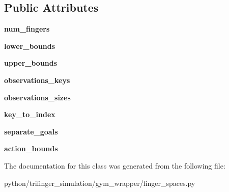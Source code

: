 \subsection*{Public Attributes}
\begin{DoxyCompactItemize}
\item 
\mbox{\label{classtrifinger__simulation_1_1gym__wrapper_1_1finger__spaces_1_1FingerSpaces_aef6a5facf4a5770bb52d7e118f27092b}} 
{\bfseries num\+\_\+fingers}
\item 
\mbox{\label{classtrifinger__simulation_1_1gym__wrapper_1_1finger__spaces_1_1FingerSpaces_ae48dce07f3223ad09ed3752f8a4ca267}} 
{\bfseries lower\+\_\+bounds}
\item 
\mbox{\label{classtrifinger__simulation_1_1gym__wrapper_1_1finger__spaces_1_1FingerSpaces_af942cd00b37c2e51bccfb724b4bcced2}} 
{\bfseries upper\+\_\+bounds}
\item 
\mbox{\label{classtrifinger__simulation_1_1gym__wrapper_1_1finger__spaces_1_1FingerSpaces_a9b82d691aebb956d9920063ff7f9169b}} 
{\bfseries observations\+\_\+keys}
\item 
\mbox{\label{classtrifinger__simulation_1_1gym__wrapper_1_1finger__spaces_1_1FingerSpaces_a6cff11eb6d063691df77044a78c348b3}} 
{\bfseries observations\+\_\+sizes}
\item 
\mbox{\label{classtrifinger__simulation_1_1gym__wrapper_1_1finger__spaces_1_1FingerSpaces_a4ba608cf0a602268b70c96ef7085401a}} 
{\bfseries key\+\_\+to\+\_\+index}
\item 
\mbox{\label{classtrifinger__simulation_1_1gym__wrapper_1_1finger__spaces_1_1FingerSpaces_a3484888d7e750fef3d594e26545d32b5}} 
{\bfseries separate\+\_\+goals}
\item 
\mbox{\label{classtrifinger__simulation_1_1gym__wrapper_1_1finger__spaces_1_1FingerSpaces_a61429f2ddc51fd47df9a296a5e32a707}} 
{\bfseries action\+\_\+bounds}
\end{DoxyCompactItemize}


The documentation for this class was generated from the following file\+:\begin{DoxyCompactItemize}
\item 
python/trifinger\+\_\+simulation/gym\+\_\+wrapper/finger\+\_\+spaces.\+py\end{DoxyCompactItemize}
